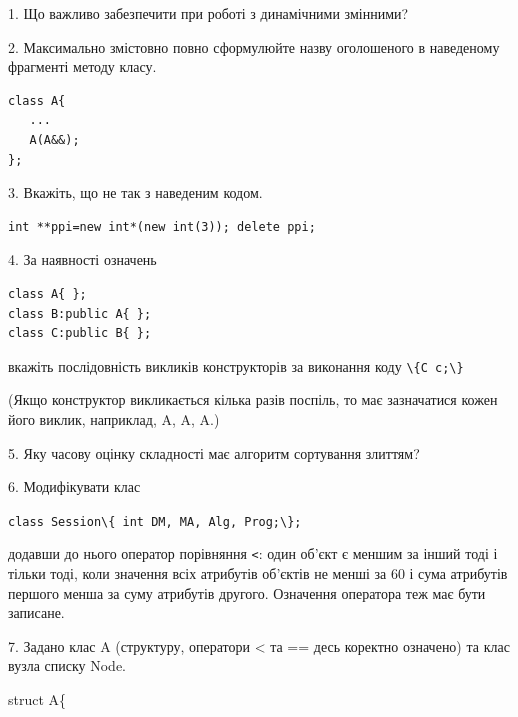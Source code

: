 \documentclass[12pt, ukrainian]{article}
\def\code#1{\Verb!#1!}
\begin{document}
{%
1. Що важливо забезпечити при роботі з динамічними змінними?%
\par
\vspace{2mm}
2. Максимально змістовно повно сформулюйте назву оголошеного в наведеному фрагменті методу класу.
\vspace{-3mm}
\begin{verbatim}class A{
   ...
   A(A&&);
};\end{verbatim}
\vspace{-3mm}
\par
\vspace{2mm}
3. Вкажіть, що не так з наведеним кодом.
\vspace{-3mm}
\begin{verbatim}int **ppi=new int*(new int(3)); delete ppi;\end{verbatim}
\vspace{-3mm}
\par
\vspace{2mm}
4. За наявності означень
\vspace{-3mm}
\begin{verbatim}
class A{ };
class B:public A{ };
class C:public B{ };\end{verbatim}
\vspace{-3mm}
вкажіть послідовність викликів конструкторів за виконання коду \code{\{C c;\}} 

(Якщо конструктор викликається кілька разів поспіль, то має зазначатися кожен його виклик, наприклад, A, A, A.)

\vspace{2mm}
5. Яку часову оцінку складності має алгоритм сортування злиттям?
\par
\vspace{2mm}
6. Модифікувати клас 

\qquad\code{class Session\{ int DM, MA, Alg, Prog;\};} 


додавши до нього оператор порівняння \code{<}: один об'єкт є меншим за інший тоді і тільки тоді, коли значення всіх атрибутів об'єктів не менші за 60 і сума атрибутів першого менша за суму атрибутів другого. Означення оператора теж має бути записане.%
\par
\vspace{2mm}
7. 
Задано клас A (структуру, оператори < та == десь коректно означено) та клас вузла списку Node.

struct A\{

}
\end{document}
